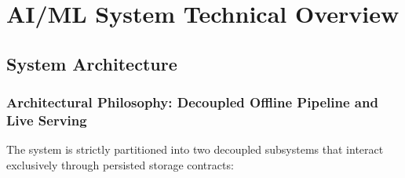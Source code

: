 
\section*{AI/ML System Technical Overview}

\subsection*{System Architecture}

\subsubsection*{Architectural Philosophy: Decoupled Offline Pipeline and Live Serving}

The system is strictly partitioned into two decoupled subsystems that interact exclusively through
persisted storage contracts:

